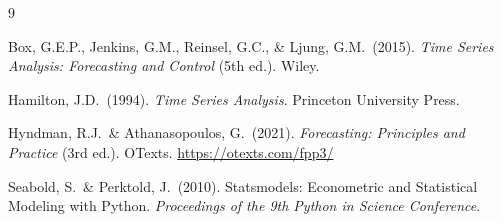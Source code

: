 \documentclass[12pt,a4paper]{article}
\begin{document}
\begin{thebibliography}{9}

Box, G.E.P., Jenkins, G.M., Reinsel, G.C., \& Ljung, G.M.\ (2015).
\textit{Time Series Analysis: Forecasting and Control} (5th ed.). Wiley.

Hamilton, J.D.\ (1994). \textit{Time Series Analysis}. Princeton University Press.

Hyndman, R.J.\ \& Athanasopoulos, G.\ (2021).
\textit{Forecasting: Principles and Practice} (3rd ed.).
OTexts. \url{https://otexts.com/fpp3/}

Seabold, S.\ \& Perktold, J.\ (2010).
Statsmodels: Econometric and Statistical Modeling with Python.
\textit{Proceedings of the 9th Python in Science Conference}.

\end{thebibliography}
\end{document}
